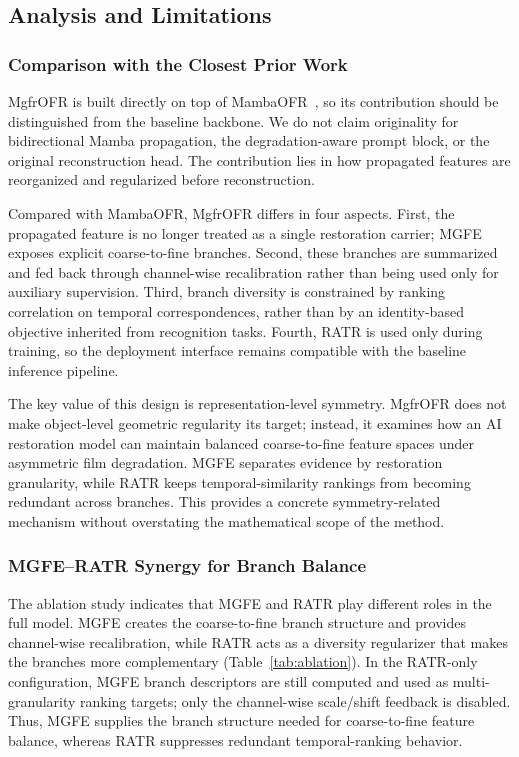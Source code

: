 \subsection{Analysis and Limitations}
\label{subsec:analysis_limitations}

\subsubsection{Comparison with the Closest Prior Work}
\label{subsec:vs_mambaofr}

MgfrOFR is built directly on top of MambaOFR~\cite{mao2025mambaofr}, so its contribution should be distinguished from the baseline backbone. We do not claim originality for bidirectional Mamba propagation, the degradation-aware prompt block, or the original reconstruction head. The contribution lies in how propagated features are reorganized and regularized before reconstruction.

Compared with MambaOFR, MgfrOFR differs in four aspects. First, the propagated feature is no longer treated as a single restoration carrier; MGFE exposes explicit coarse-to-fine branches. Second, these branches are summarized and fed back through channel-wise recalibration rather than being used only for auxiliary supervision. Third, branch diversity is constrained by ranking correlation on temporal correspondences, rather than by an identity-based objective inherited from recognition tasks. Fourth, RATR is used only during training, so the deployment interface remains compatible with the baseline inference pipeline.

The key value of this design is representation-level symmetry. MgfrOFR does not make object-level geometric regularity its target; instead, it examines how an AI restoration model can maintain balanced coarse-to-fine feature spaces under asymmetric film degradation. MGFE separates evidence by restoration granularity, while RATR keeps temporal-similarity rankings from becoming redundant across branches. This provides a concrete symmetry-related mechanism without overstating the mathematical scope of the method.

\subsubsection{MGFE--RATR Synergy for Branch Balance}
\label{subsec:synergy}

The ablation study indicates that MGFE and RATR play different roles in the full model. MGFE creates the coarse-to-fine branch structure and provides channel-wise recalibration, while RATR acts as a diversity regularizer that makes the branches more complementary (Table~\ref{tab:ablation}). In the RATR-only configuration, MGFE branch descriptors are still computed and used as multi-granularity ranking targets; only the channel-wise scale/shift feedback is disabled. Thus, MGFE supplies the branch structure needed for coarse-to-fine feature balance, whereas RATR suppresses redundant temporal-ranking behavior.

